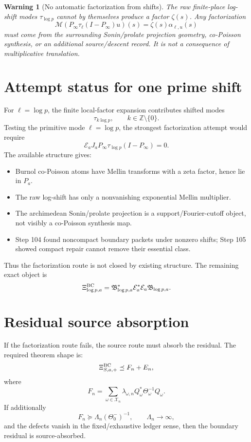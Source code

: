 \documentclass[11pt]{article}
\newtheorem{warning}{Warning}
\newcommand{\E}{\mathcal E}
\newcommand{\M}{\mathcal M}
\begin{document}
\begin{warning}[No automatic factorization from shifts]
The raw finite-place log-shift modes \(\tau_{\log p}\) cannot by themselves produce a factor \(\zeta(s)\).  Any factorization
\[
  \M(P_\infty\tau_\ell(I-P_\infty)u)(s)=\zeta(s)\alpha_{\ell,u}(s)
\]
must come from the surrounding Sonin/prolate projection geometry, co-Poisson synthesis, or an additional source/descent record.  It is not a consequence of multiplicative translation.
\end{warning}

\section{Attempt status for one prime shift}
For \(\ell=\log p\), the finite local-factor expansion contributes shifted modes
\[
  \tau_{k\log p},\qquad k\in\mathbb Z\setminus\{0\}.
\]
Testing the primitive mode \(\ell=\log p\), the strongest factorization attempt would require
\[
  \E_aJ_aP_\infty\tau_{\log p}(I-P_\infty)=0.
\]
The available structure gives:
\begin{itemize}[leftmargin=2em]
  \item Burnol co-Poisson atoms have Mellin transforms with a zeta factor, hence lie in \(P_a\).
  \item The raw log-shift has only a nonvanishing exponential Mellin multiplier.
  \item The archimedean Sonin/prolate projection is a support/Fourier-cutoff object, not visibly a co-Poisson synthesis map.
  \item Step 104 found noncompact boundary packets under nonzero shifts; Step 105 showed compact repair cannot remove their essential class.
\end{itemize}
Thus the factorization route is not closed by existing structure.  The remaining exact object is
\[
  \Xi^{\rm BC}_{\log p,a}=\mathfrak B_{\log p,a}^*\E_a^*\E_a\mathfrak B_{\log p,a}.
\]

\section{Residual source absorption}
If the factorization route fails, the source route must absorb the residual.  The required theorem shape is:
\[
  \Xi^{\rm BC}_{S,a,+}\preceq F_n+E_n,
\]
where
\[
  F_n=\sum_{\omega\in\mathcal X_n}\lambda_{\omega,n}Q_\omega^*\Theta_\omega^{-1}Q_\omega.
\]
If additionally
\[
  F_n\succeq \Lambda_n(\Theta_0^-)^{-1},
  \qquad \Lambda_n\to\infty,
\]
and the defects vanish in the fixed/exhaustive ledger sense, then the boundary residual is source-absorbed.
\end{document}

